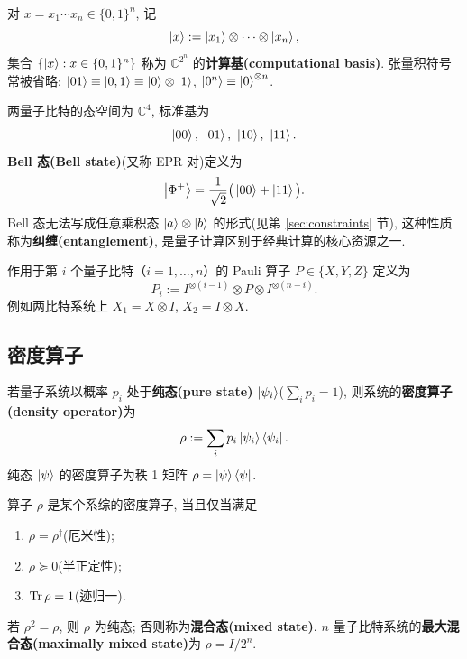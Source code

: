 \documentclass[utf8]{article} %
\numberwithin{equation}{section}   %
\newtheorem{Def}{\hskip 2em {\color{green} 定义}}[subsection]
\newtheorem{Thm}{\hskip 2em {\color{blue} 定理}}[subsection]
\newtheorem{Eg}{\hskip 2em {\color{black} 例}}[subsection]
\begin{document}
\begin{Def}[计算基]
    对 $x = x_1\cdots x_n \in \{0,1\}^n$, 记
    \begin{equation}
        \ket{x} := \ket{x_1}\otimes\cdots\otimes\ket{x_n},
    \end{equation}
    集合 $\{\ket{x}: x \in \{0,1\}^n\}$ 称为 $\mathbb{C}^{2^n}$ 的\textbf{计算基(computational basis)}.
    张量积符号常被省略: $\ket{01} \equiv \ket{0,1} \equiv \ket{0}\otimes\ket{1}$, $\ket{0^n} \equiv \ket{0}^{\otimes n}$.
\end{Def}

\begin{Eg}
    两量子比特的态空间为 $\mathbb{C}^4$, 标准基为
    \[ \ket{00},\ \ket{01},\ \ket{10},\ \ket{11}. \]
    \textbf{Bell 态(Bell state)}(又称 EPR 对)定义为
    \begin{equation}
        \ket{\Phi^+} = \frac{1}{\sqrt{2}}\big(\ket{00} + \ket{11}\big).
    \end{equation}
    Bell 态无法写成任意乘积态 $\ket{a}\otimes\ket{b}$ 的形式(见第 \ref{sec:constraints} 节),
    这种性质称为\textbf{纠缠(entanglement)}, 是量子计算区别于经典计算的核心资源之一.
\end{Eg}

\begin{Def}
    作用于第 $i$ 个量子比特（$i = 1, \dots, n$）的 Pauli 算子 $P \in \{X, Y, Z\}$ 定义为
    \begin{equation}
        P_i := I^{\otimes (i-1)} \otimes P \otimes I^{\otimes (n-i)}.
    \end{equation}
    例如两比特系统上 $X_1 = X \otimes I$, $X_2 = I \otimes X$.
\end{Def}

\subsection{密度算子}

\begin{Def}[密度算子]
    若量子系统以概率 $p_i$ 处于\textbf{纯态(pure state)} $\ket{\psi_i}$($\sum_i p_i = 1$), 则系统的\textbf{密度算子(density operator)}为
    \begin{equation}
        \rho := \sum_i p_i \ket{\psi_i}\bra{\psi_i}.
    \end{equation}
    纯态 $\ket{\psi}$ 的密度算子为秩 1 矩阵 $\rho = \ket{\psi}\bra{\psi}$.
\end{Def}

\begin{Thm}
    算子 $\rho$ 是某个系综的密度算子, 当且仅当满足
    \begin{enumerate}
        \item $\rho = \rho^\dagger$(厄米性);
        \item $\rho \succeq 0$(半正定性);
        \item $\Tr \rho = 1$(迹归一).
    \end{enumerate}
    若 $\rho^2 = \rho$, 则 $\rho$ 为纯态; 否则称为\textbf{混合态(mixed state)}.
    $n$ 量子比特系统的\textbf{最大混合态(maximally mixed state)}为 $\rho = I/2^n$.
\end{Thm}
\end{document}
